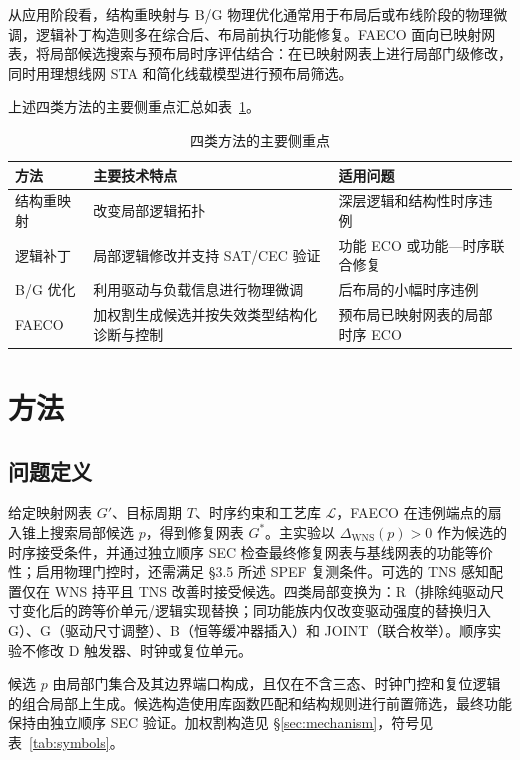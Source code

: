 \documentclass[twocolumn,10pt,fontset=windows]{ctexart}
\begin{document}
从应用阶段看，结构重映射与 B/G 物理优化通常用于布局后或布线阶段的物理微调，逻辑补丁构造则多在综合后、布局前执行功能修复。FAECO 面向已映射网表，将局部候选搜索与预布局时序评估结合：在已映射网表上进行局部门级修改，同时用理想线网 STA 和简化线载模型进行预布局筛选。

上述四类方法的主要侧重点汇总如表~\ref{tab:related_diff}。

\begin{table}[H]
\centering
\caption{四类方法的主要侧重点}
\label{tab:related_diff}
\footnotesize
\setlength{\tabcolsep}{2pt}
\begin{tabular}{>{\raggedright\arraybackslash}p{1.55cm}>{\raggedright\arraybackslash}p{2.55cm}>{\raggedright\arraybackslash}p{3.2cm}}
\toprule
\textbf{方法} & \textbf{主要技术特点} & \textbf{适用问题} \\
\midrule
结构重映射 & 改变局部逻辑拓扑 & 深层逻辑和结构性时序违例 \\
逻辑补丁 & 局部逻辑修改并支持 SAT/CEC 验证 & 功能 ECO 或功能—时序联合修复 \\
B/G 优化 & 利用驱动与负载信息进行物理微调 & 后布局的小幅时序违例 \\
FAECO & 加权割生成候选并按失效类型结构化诊断与控制 & 预布局已映射网表的局部时序 ECO \\
\bottomrule
\end{tabular}
\end{table}

\section{方法}

\subsection{问题定义}
给定映射网表 $G'$、目标周期 $T$、时序约束和工艺库 $\mathcal{L}$，FAECO 在违例端点的扇入锥上搜索局部候选 $p$，得到修复网表 $G^*$。主实验以 $\Delta_{\mathrm{WNS}}(p)>0$ 作为候选的时序接受条件，并通过独立顺序 SEC 检查最终修复网表与基线网表的功能等价性；启用物理门控时，还需满足 §3.5 所述 SPEF 复测条件。可选的 TNS 感知配置仅在 WNS 持平且 TNS 改善时接受候选。四类局部变换为：R（排除纯驱动尺寸变化后的跨等价单元/逻辑实现替换；同功能族内仅改变驱动强度的替换归入 G）、G（驱动尺寸调整）、B（恒等缓冲器插入）和 JOINT（联合枚举）。顺序实验不修改 D 触发器、时钟或复位单元。

候选 $p$ 由局部门集合及其边界端口构成，且仅在不含三态、时钟门控和复位逻辑的组合局部上生成。候选构造使用库函数匹配和结构规则进行前置筛选，最终功能保持由独立顺序 SEC 验证。加权割构造见 \S\ref{sec:mechanism}，符号见表~\ref{tab:symbols}。
\end{document}

